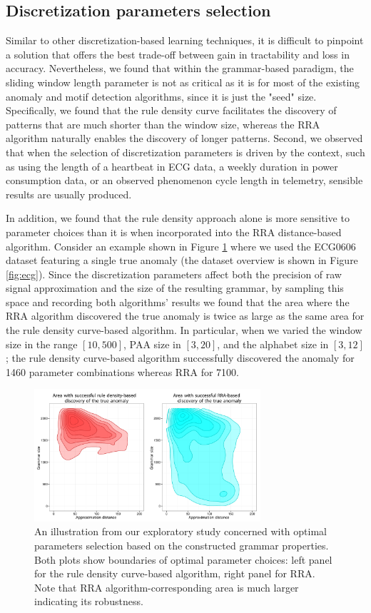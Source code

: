 \documentclass{sig-alternate}
\begin{document}
\subsection{Discretization parameters selection}
Similar to other discretization-based learning techniques, it is difficult to pinpoint a solution that offers the best trade-off between gain in tractability and loss in accuracy. Nevertheless, we found that within the grammar-based paradigm, the sliding window length parameter is not as critical as it is for most of the existing anomaly and motif detection algorithms, since it is just the "seed" size. Specifically, we found that the rule density curve facilitates the discovery of patterns that are much shorter than the window size, whereas the RRA algorithm naturally enables the discovery of longer patterns. Second, we observed that when the selection of discretization parameters is driven by the context, such as using the length of a heartbeat in ECG data, a weekly duration in power consumption data, or an observed phenomenon cycle length in telemetry, sensible results are usually produced. 

In addition, we found that the rule density approach alone is more sensitive to parameter choices than it is when incorporated into the RRA distance-based algorithm. Consider an example shown in Figure \ref{fig:area} where we used the ECG0606 dataset featuring a single true anomaly (the dataset overview is shown in Figure \ref{fig:ecg}). Since the discretization parameters affect both the precision of raw signal approximation and the size of the resulting grammar, by sampling this space and recording both algorithms' results we found that the area where the RRA algorithm discovered the true anomaly is twice as large as the same area for the rule density curve-based algorithm. In particular, when we varied the window size in the range $[10,500]$, PAA size in $[3,20]$, and the alphabet size in $[3,12]$; the rule density curve-based algorithm successfully discovered the anomaly for 1460 parameter combinations whereas RRA for 7100.

\begin{figure}[t]
   \centering
   \includegraphics[width=84mm]{ecg0606_areas.pdf}
   \caption{An illustration from our exploratory study concerned with optimal parameters selection based on the constructed grammar properties. Both plots show boundaries of optimal parameter choices: left panel for the rule density curve-based algorithm, right panel for RRA. Note that RRA algorithm-corresponding area is much larger indicating its robustness.}
   \label{fig:area}
\end{figure}
\end{document}
